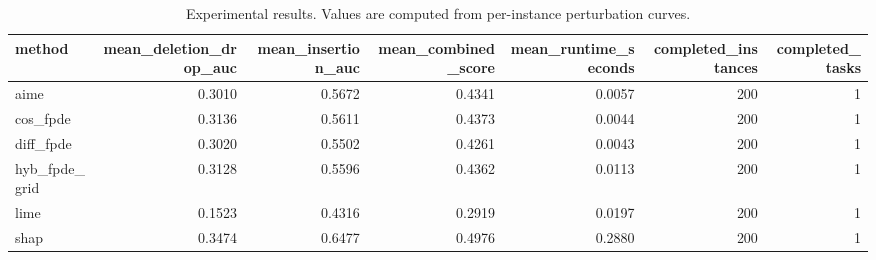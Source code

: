\begin{table}[t]
\caption{Experimental results. Values are computed from per-instance perturbation curves.}
\label{tab:main_results_computed}
\centering
\begin{tabular}{lrrrrrr}
\toprule
method & mean\_deletion\_drop\_auc & mean\_insertion\_auc & mean\_combined\_score & mean\_runtime\_seconds & completed\_instances & completed\_tasks \\
\midrule
aime & 0.3010 & 0.5672 & 0.4341 & 0.0057 & 200 & 1 \\
cos\_fpde & 0.3136 & 0.5611 & 0.4373 & 0.0044 & 200 & 1 \\
diff\_fpde & 0.3020 & 0.5502 & 0.4261 & 0.0043 & 200 & 1 \\
hyb\_fpde\_grid & 0.3128 & 0.5596 & 0.4362 & 0.0113 & 200 & 1 \\
lime & 0.1523 & 0.4316 & 0.2919 & 0.0197 & 200 & 1 \\
shap & 0.3474 & 0.6477 & 0.4976 & 0.2880 & 200 & 1 \\
\bottomrule
\end{tabular}

\end{table}
